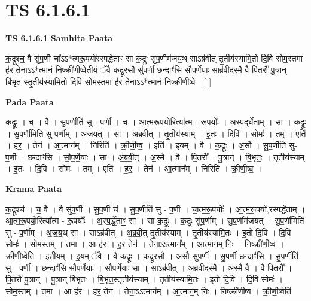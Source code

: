 \documentclass[17pt]{extarticle}
\begin{document}
\section{ TS 6.1.6.1 }

\textbf{TS 6.1.6.1 } \newline
\textbf{Samhita Paata} \newline

क॒द्रूश्च॒ वै सु॑प॒र्णी चा᳚ऽऽ*त्मरू॒पयो॑रस्पर्द्धेताꣳ॒॒ सा क॒द्रूः सु॑प॒र्णीम॑जय॒थ् साऽब्र॑वीत् तृ॒तीय॑स्यामि॒तो दि॒वि सोम॒स्तमा ह॑र॒ तेना॒ऽऽ*त्मानं॒ निष्क्री॑णी॒ष्वेती॒यं ॅवै क॒द्रूर॒सौ सु॑प॒र्णी छन्दाꣳ॑सि सौपर्णे॒याः साब्र॑वीद॒स्मै वै पि॒तरौ॑ पु॒त्रान् बि॑भृत-स्तृ॒तीय॑स्यामि॒तो दि॒वि सोम॒स्तमा ह॑र॒ तेना॒ऽऽ*त्मानं॒ निष्क्री॑णी॒ष्वे - [  ] \newline

\textbf{Pada Paata} \newline

क॒द्रूः । च॒ । वै । सु॒प॒र्णीति॑ सु - प॒र्णी । च॒ । आ॒त्म॒रू॒पयो॒रित्या᳚त्म - रू॒पयोः᳚ । अ॒स्प॒द्‌र्धे॒ता॒म् । सा । क॒द्रूः । सु॒प॒र्णीमिति॑ सु-प॒र्णीम् । अ॒ज॒य॒त् । सा । अ॒ब्र॒वी॒त् । तृ॒तीय॑स्याम् । इ॒तः । दि॒वि । सोमः॑ । तम् । एति॑ । ह॒र॒ । तेन॑ । आ॒त्मान᳚म् । निरिति॑ । क्री॒णी॒ष्व॒ । इति॑ । इ॒यम् । वै । क॒द्रूः । अ॒सौ । सु॒प॒र्णीति॑ सु-प॒र्णी । छन्दाꣳ॑सि । सौ॒प॒र्णे॒याः । सा । अ॒ब्र॒वी॒त् । अ॒स्मै । वै । पि॒तरौ᳚ । पु॒त्रान् । बि॒भृ॒तः॒ । तृ॒तीय॑स्याम् । इ॒तः । दि॒वि । सोमः॑ । तम् । एति॑ । ह॒र॒ । तेन॑ । आ॒त्मान᳚म् । निरिति॑ । क्री॒णी॒ष्व॒ ।  \newline


\textbf{Krama Paata} \newline

क॒द्रूश्च॑ । च॒ वै । वै सु॑प॒र्णी । सु॒प॒र्णी च॑ । सु॒प॒र्णीति॑ सु - प॒र्णी । चा॒त्म॒रू॒पयोः᳚ । आ॒त्म॒रू॒पयो॑,रस्पर्द्धेताम् । आ॒त्म॒रू॒पयो॒रित्या᳚त्म - रू॒पयोः᳚ । अ॒स्प॒र्द्धे॒ताꣳ॒॒ सा । सा क॒द्रूः । क॒द्रूः सु॑प॒र्णीम् । सु॒प॒र्णीम॑जयत् । सु॒प॒र्णीमिति॑ सु - प॒र्णीम् । अ॒ज॒य॒थ् सा । साऽब्र॑वीत् । अ॒ब्र॒वी॒त् तृ॒तीय॑स्याम् । तृ॒तीय॑स्यामि॒तः । इ॒तो दि॒वि । दि॒वि सोमः॑ । सोम॒स्तम् । तमा । आ ह॑र । ह॒र॒ तेन॑ । तेना॒ऽऽत्मान᳚म् । आ॒त्मान॒म् निः । निष्क्री॑णीष्व । क्री॒णी॒ष्वेति॑ । इती॒यम् । इ॒यम् ॅवै । वै क॒द्रूः । क॒द्रूर॒सौ । अ॒सौ सु॑प॒र्णी । सु॒प॒र्णी छन्दाꣳ॑सि । सु॒प॒र्णीति॑ सु - प॒र्णी । छन्दाꣳ॑सि सौपर्णे॒याः । सौ॒प॒र्णे॒याः सा । साऽब्र॑वीत् । अ॒ब्र॒वी॒द॒स्मै । अ॒स्मै वै । वै पि॒तरौ᳚ । पि॒तरौ॑ पु॒त्रान् । पु॒त्रान् बि॑भृतः । बि॒भृ॒त॒स्तृ॒तीय॑स्याम् । तृ॒तीय॑स्यामि॒तः । इ॒तो दि॒वि । दि॒वि सोमः॑ । सोम॒स्तम् । तमा । आ ह॑र । ह॒र॒ तेन॑ । तेना॒ऽऽत्मान᳚म् । आ॒त्मान॒म् निः । निष्क्री॑णीष्व । क्री॒णी॒ष्वेति॑ \newline
\end{document}
